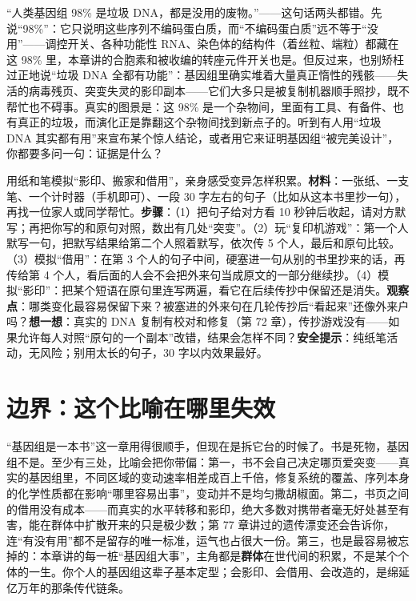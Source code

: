 \begin{wuqu}
“人类基因组 98\% 是垃圾 DNA，都是没用的废物。”——这句话两头都错。先说“98\%”：它只说明这些序列不编码蛋白质，而“不编码蛋白质”远不等于“没用”——调控开关、各种功能性 RNA、染色体的结构件（着丝粒、端粒）都藏在这 98\% 里，本章讲的合胞素和被收编的转座元件开关也是。但反过来，也别矫枉过正地说“垃圾 DNA 全都有功能”：基因组里确实堆着大量真正惰性的残骸——失活的病毒残页、突变失灵的影印副本——它们大多只是被复制机器顺手照抄，既不帮忙也不碍事。真实的图景是：这 98\% 是一个杂物间，里面有工具、有备件、也有真正的垃圾，而演化正是靠翻这个杂物间找到新点子的。听到有人用“垃圾 DNA 其实都有用”来宣布某个惊人结论，或者用它来证明基因组“被完美设计”，你都要多问一句：证据是什么？
\end{wuqu}

\begin{shiyan}
用纸和笔模拟“影印、搬家和借用”，亲身感受变异怎样积累。\textbf{材料}：一张纸、一支笔、一个计时器（手机即可）、一段 30 字左右的句子（比如从这本书里抄一句），再找一位家人或同学帮忙。\textbf{步骤}：（1）把句子给对方看 10 秒钟后收起，请对方默写；再把你写的和原句对照，数出有几处“突变”。（2）玩“复印机游戏”：第一个人默写一句，把默写结果给第二个人照着默写，依次传 5 个人，最后和原句比较。（3）模拟“借用”：在第 3 个人的句子中间，硬塞进一句从别的书里抄来的话，再传给第 4 个人，看后面的人会不会把外来句当成原文的一部分继续抄。（4）模拟“影印”：把某个短语在原句里连写两遍，看它在后续传抄中保留还是消失。\textbf{观察点}：哪类变化最容易保留下来？被塞进的外来句在几轮传抄后“看起来”还像外来户吗？\textbf{想一想}：真实的 DNA 复制有校对和修复（第 72 章），传抄游戏没有——如果允许每人对照“原句的一个副本”改错，结果会怎样不同？\textbf{安全提示}：纯纸笔活动，无风险；别用太长的句子，30 字以内效果最好。
\end{shiyan}

\section{边界：这个比喻在哪里失效}

“基因组是一本书”这一章用得很顺手，但现在是拆它台的时候了。书是死物，基因组不是。至少有三处，比喻会把你带偏：第一，书不会自己决定哪页爱突变——真实的基因组里，不同区域的变动速率相差成百上千倍，修复系统的覆盖、序列本身的化学性质都在影响“哪里容易出事”，变动并不是均匀撒胡椒面。第二，书页之间的借用没有成本——而真实的水平转移和影印，绝大多数对携带者毫无好处甚至有害，能在群体中扩散开来的只是极少数；第 77 章讲过的遗传漂变还会告诉你，连“有没有用”都不是留存的唯一标准，运气也占很大一份。第三，也是最容易被忘掉的：本章讲的每一桩“基因组大事”，主角都是\textbf{群体}在世代间的积累，不是某个个体的一生。你个人的基因组这辈子基本定型；会影印、会借用、会改造的，是绵延亿万年的那条传代链条。

